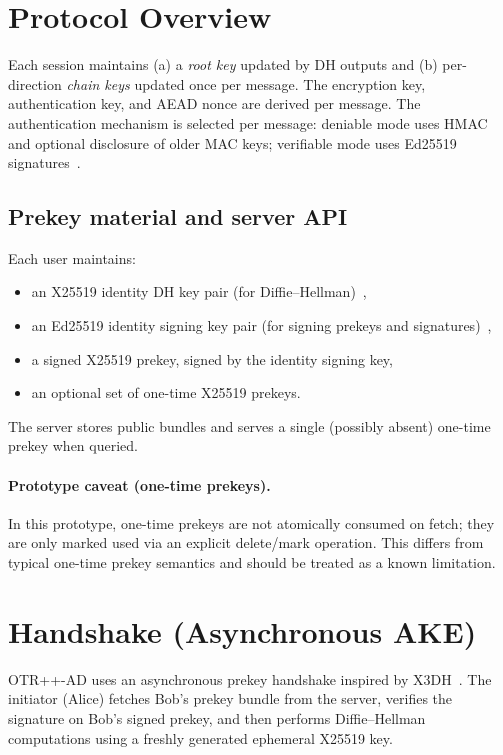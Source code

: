 \documentclass[11pt]{article}
\newcommand{\prot}{OTR++-AD}
\begin{document}
\section{Protocol Overview}
Each session maintains (a) a \emph{root key} updated by DH outputs and (b) per-direction \emph{chain keys} updated once per message.
The encryption key, authentication key, and AEAD nonce are derived per message.
The authentication mechanism is selected per message: deniable mode uses HMAC~\cite{rfc2104} and optional disclosure of older MAC keys; verifiable mode uses Ed25519 signatures~\cite{rfc8032}.

\subsection{Prekey material and server API}
Each user maintains:
\begin{itemize}
\item an X25519 identity DH key pair (for Diffie--Hellman)~\cite{rfc7748},
\item an Ed25519 identity signing key pair (for signing prekeys and signatures)~\cite{rfc8032},
\item a signed X25519 prekey, signed by the identity signing key,
\item an optional set of one-time X25519 prekeys.
\end{itemize}
The server stores public bundles and serves a single (possibly absent) one-time prekey when queried.

\paragraph{Prototype caveat (one-time prekeys).}
In this prototype, one-time prekeys are not atomically consumed on fetch; they are only marked used via an explicit delete/mark operation.
This differs from typical one-time prekey semantics and should be treated as a known limitation.

\section{Handshake (Asynchronous AKE)}
\prot{} uses an asynchronous prekey handshake inspired by X3DH~\cite{signal_x3dh}.
The initiator (Alice) fetches Bob's prekey bundle from the server, verifies the signature on Bob's signed prekey, and then performs Diffie--Hellman computations using a freshly generated ephemeral X25519 key.
\end{document}
